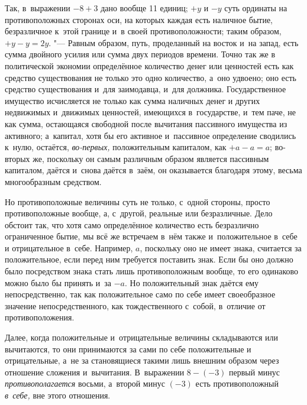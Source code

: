 Так, в~выражении $-8+3$ дано вообще 11 единиц; $+y$ и $-y$ суть
ординаты на противоположных сторонах оси, на которых каждая есть наличное
бытие, безразличное к~этой границе и~в своей противоположности; таким
образом, $+y-y=2y$. "--- Равным образом, путь,
проделанный на восток и~на запад, есть
сумма двойного усилия или сумма двух периодов времени. Точно так же в
политической экономии определённое количество денег или ценностей есть как
средство существования не только это одно количество, а~оно удвоено; оно
есть средство существования и~для заимодавца, и~для должника.
Государственное имущество исчисляется не только как сумма наличных денег и
других недвижимых и~движимых ценностей, имеющихся в~государстве, и~тем
паче, не как сумма, остающаяся свободной после вычитания пассивного
имущества из активного; а~капитал, хотя бы его активное и~пассивное
определение сводились к~нулю, остаётся,
{\em во-первых,} положительным капиталом, как $+a-a=a$;
во-вторых же, поскольку он самым различным образом является пассивным
капиталом, даётся и~снова даётся в~заём, он оказывается благодаря этому,
весьма многообразным средством.

Но противоположные величины суть не только, с~одной стороны, просто
противоположные вообще, а, с~другой, реальные или безразличные. Дело
обстоит так, что хотя само определённое количество есть безразлично
ограниченное бытие, мы всё же встречаем в~нём также и~положительное в~себе
и отрицательное в~себе. Например, $a$, поскольку
оно не имеет знака, считается за положительное, если перед ним требуется
поставить знак. Если бы оно должно было посредством знака стать лишь
противоположным вообще, то его одинаково можно было бы принять и~за
$-a$. Но положительный знак даётся ему
непосредственно, так как положительное само по себе имеет своеобразное
значение непосредственного, как тождественного с~собой, в~отличие от
противоположения.

Далее, когда положительные и~отрицательные величины складываются или
вычитаются, то они принимаются за сами по себе положительные и
отрицательные, а~не за становящиеся такими лишь внешним образом через
отношение сложения и~вычитания. В~выражении $8-(-3)$ первый минус
{\em противополагается} восьми, а~второй минус $(-3)$
есть противоположный {\em в~себе,} вне этого отношения.

